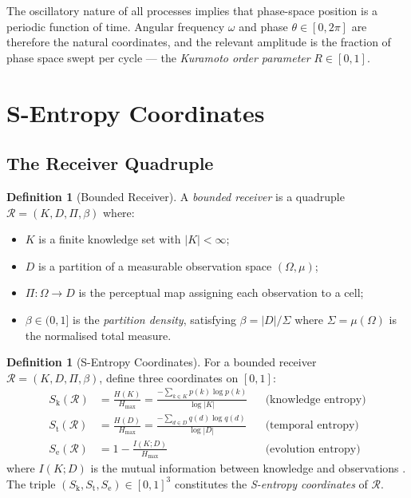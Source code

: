 \documentclass[twocolumn,11pt,a4paper]{article}
\theoremstyle{plain}
\theoremstyle{definition}
\newtheorem{definition}[theorem]{Definition}
\theoremstyle{remark}
\newcommand{\Sk}{S_{\mathrm{k}}}
\newcommand{\St}{S_{\mathrm{t}}}
\newcommand{\Se}{S_{\mathrm{e}}}
\newcommand{\abs}[1]{\left|#1\right|}
\begin{document}
The oscillatory nature of all processes implies that phase-space position is a periodic function of time.  Angular frequency $\omega$ and phase $\theta \in [0,2\pi]$ are therefore the natural coordinates, and the relevant amplitude is the fraction of phase space swept per cycle — the \emph{Kuramoto order parameter} $R \in [0,1]$.

\section{S-Entropy Coordinates}
\label{sec:sentropy}

\subsection{The Receiver Quadruple}

\begin{definition}[Bounded Receiver]
\label{def:receiver}
A \emph{bounded receiver} is a quadruple $\mathcal{R} = (K, D, \Pi, \beta)$ where:
\begin{itemize}[noitemsep]
  \item $K$ is a finite knowledge set with $\abs{K} < \infty$;
  \item $D$ is a partition of a measurable observation space $(\Omega,\mu)$;
  \item $\Pi : \Omega \to D$ is the perceptual map assigning each observation to a cell;
  \item $\beta \in (0,1]$ is the \emph{partition density}, satisfying $\beta = \abs{D}/\Sigma$ where $\Sigma = \mu(\Omega)$ is the normalised total measure.
\end{itemize}
\end{definition}

\begin{definition}[S-Entropy Coordinates]
\label{def:sentropy}
For a bounded receiver $\mathcal{R} = (K,D,\Pi,\beta)$, define three coordinates on $[0,1]$:
\begin{align}
  \Sk(\mathcal{R}) &= \frac{H(K)}{H_{\max}} = \frac{-\sum_{k\in K} p(k)\log p(k)}{\log\abs{K}} && \text{(knowledge entropy)}\label{eq:sk}\\
  \St(\mathcal{R}) &= \frac{H(D)}{H_{\max}} = \frac{-\sum_{d\in D} q(d)\log q(d)}{\log\abs{D}} && \text{(temporal entropy)}\label{eq:st}\\
  \Se(\mathcal{R}) &= 1 - \frac{I(K;D)}{H_{\max}} && \text{(evolution entropy)}\label{eq:se}
\end{align}
where $I(K;D)$ is the mutual information between knowledge and observations \citep{shannon1948,coverthomas2006}.  The triple $(\Sk,\St,\Se)\in[0,1]^3$ constitutes the \emph{S-entropy coordinates} of $\mathcal{R}$.
\end{definition}
\end{document}
